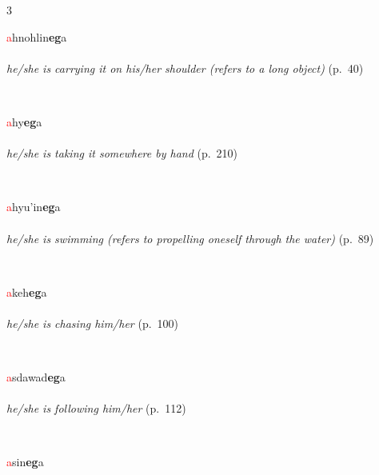 \documentclass[oneside,openany]{book}%
\begin{document}
\noindent\begin{multicols}{3}%
\begin{minipage}[t]{\linewidth}
\raggedright\noindent \textcolor{Red}{a}hnohlin\textbf{eg}a\\
\\
\noindent \textit{he/she is carrying it on his/her shoulder (refers to a long object)} (p.~40)
\end{minipage}\\[1em]%
\begin{minipage}[t]{\linewidth}
\raggedright\noindent \textcolor{Red}{a}hy\textbf{eg}a\\
\\
\noindent \textit{he/she is taking it somewhere by hand} (p.~210)
\end{minipage}\\[1em]%
\begin{minipage}[t]{\linewidth}
\raggedright\noindent \textcolor{Red}{a}hyu'in\textbf{eg}a\\
\\
\noindent \textit{he/she is swimming (refers to propelling oneself through the water)} (p.~89)
\end{minipage}\\[1em]%
\begin{minipage}[t]{\linewidth}
\raggedright\noindent \textcolor{Red}{a}keh\textbf{eg}a\\
\\
\noindent \textit{he/she is chasing him/her} (p.~100)
\end{minipage}\\[1em]%
\begin{minipage}[t]{\linewidth}
\raggedright\noindent \textcolor{Red}{a}sdawad\textbf{eg}a\\
\\
\noindent \textit{he/she is following him/her} (p.~112)
\end{minipage}\\[1em]%
\begin{minipage}[t]{\linewidth}
\raggedright\noindent \textcolor{Red}{a}sin\textbf{eg}a\\

\end{minipage}
\end{multicols}
\end{document}
